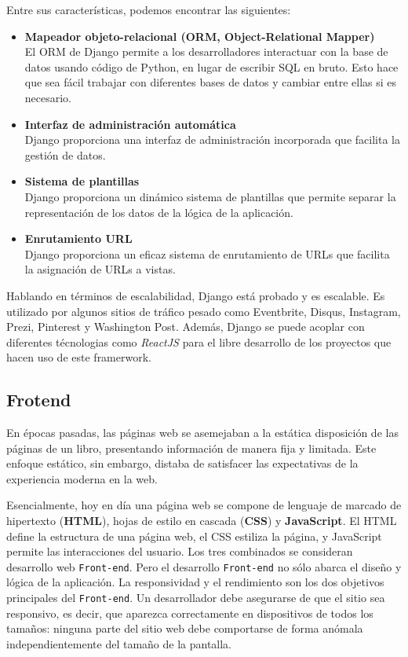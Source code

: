 Entre sus características, podemos encontrar las siguientes:
\begin{itemize}
    \item \textbf{Mapeador objeto-relacional (ORM, Object-Relational Mapper)}\\
    El ORM de Django permite a los desarrolladores interactuar con la base de datos usando código de Python, en lugar de escribir SQL en bruto. Esto hace que sea fácil trabajar con diferentes bases de datos y cambiar entre ellas si es necesario.

    \item \textbf{Interfaz de administración automática} \\
    Django proporciona una interfaz de administración incorporada que facilita la gestión de datos.
    
    \item \textbf{Sistema de plantillas}\\
    Django proporciona un dinámico sistema de plantillas que permite separar la representación de los datos de la lógica de la aplicación.

    \item \textbf{Enrutamiento URL}\\
    Django proporciona un eficaz sistema de enrutamiento de URLs que facilita la asignación de URLs a vistas.
    \\
\end{itemize}

Hablando en términos de escalabilidad, Django está probado y es escalable. Es utilizado por algunos sitios de tráfico pesado como Eventbrite, Disqus, Instagram, Prezi, Pinterest y Washington Post. Además, Django se puede acoplar con diferentes técnologias como \textit{ReactJS} para el libre desarrollo de los proyectos que hacen uso de este framerwork.

\subsection{Frotend}

En épocas pasadas, las páginas web se asemejaban a la estática disposición de las páginas de un libro, presentando información de manera fija y limitada. Este enfoque estático, sin embargo, distaba de satisfacer las expectativas de la experiencia moderna en la web.

Esencialmente, hoy en día una página web se compone de lenguaje de marcado de hipertexto (\textbf{HTML}), hojas de estilo en cascada (\textbf{CSS}) y \textbf{JavaScript}. El HTML define la estructura de una página web, el CSS estiliza la página, y JavaScript permite las interacciones del usuario. Los tres combinados se consideran desarrollo web \texttt{Front-end}.
Pero el desarrollo \texttt{Front-end} no sólo abarca el diseño y lógica de la aplicación. La responsividad y el rendimiento son los dos objetivos principales del \texttt{Front-end}. Un desarrollador debe asegurarse de que el sitio sea responsivo, es decir, que aparezca correctamente en dispositivos de todos los tamaños: ninguna parte del sitio web debe comportarse de forma anómala independientemente del tamaño de la pantalla.\\


